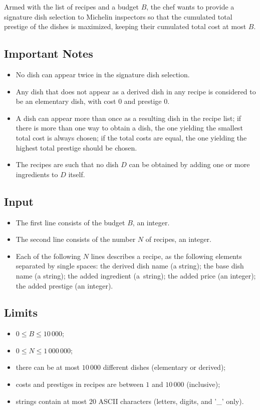 \medskip

Armed with the list of recipes and a budget $B$, the chef wants to provide a
signature dish selection to Michelin inspectors so that the cumulated
total prestige of the dishes is maximized, keeping their cumulated total
cost at most $B$. 

\subsection*{Important Notes}
\begin{itemize}
\item No dish can appear twice in the signature dish selection.
\item Any dish that does not appear as a derived dish in any recipe is
  considered to be an elementary dish, with cost 0 and prestige 0.
\item A dish can
  appear more than once as a resulting dish in the recipe list; if
  there is more than one way to obtain a dish, the one yielding the
  smallest total cost is
  always chosen; if the total costs are equal, the one yielding the highest
  total prestige should be chosen.
\item The recipes are such that no dish $D$ can be obtained by adding one or more
  ingredients to $D$ itself.
\end{itemize}

\subsection*{Input}

\begin{itemize}
\item The first line consists of the budget $B$, an integer.
\item The second line consists of the number $N$ of recipes, an integer.
\item Each of the following $N$ lines describes a recipe, as the
  following elements separated by single spaces: the derived dish
  name (a string); the base dish name (a string);
  the added ingredient (a~string); the added price (an integer); the
  added prestige (an integer).
\end{itemize}

\clearpage
\subsection*{Limits}
\begin{itemize}
\item $0\leqslant B\leqslant 10\,000$;
\item $0\leqslant N \leqslant 1\,000\,000$;
\item there can be at most $10\,000$ different dishes (elementary or
  derived);
\item costs and prestiges in recipes are between $1$ and $10\,000$
  (inclusive);
\item strings contain at most $20$ ASCII characters (letters, digits, and '\_' only).
\end{itemize}

